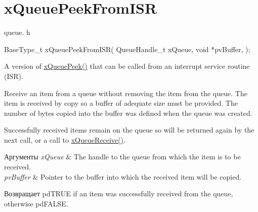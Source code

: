 \hypertarget{group__x_queue_peek_from_i_s_r}{}\section{x\+Queue\+Peek\+From\+I\+SR}
\label{group__x_queue_peek_from_i_s_r}
queue. h 
\begin{DoxyPre}
BaseType\_t xQueuePeekFromISR(
                                QueueHandle\_t xQueue,
                                void *pvBuffer,
                            );\end{DoxyPre}


A version of \mbox{\hyperlink{queue_8h_a3f9e430276fe5244417fd82644ec8a75}{x\+Queue\+Peek()}} that can be called from an interrupt service routine (I\+SR).

Receive an item from a queue without removing the item from the queue. The item is received by copy so a buffer of adequate size must be provided. The number of bytes copied into the buffer was defined when the queue was created.

Successfully received items remain on the queue so will be returned again by the next call, or a call to \mbox{\hyperlink{queue_8h_ae8364d988c6f9b63c771cc2b3dfe5df9}{x\+Queue\+Receive()}}.


\begin{DoxyParams}{Аргументы}
{\em x\+Queue} & The handle to the queue from which the item is to be received.\\
\hline
{\em pv\+Buffer} & Pointer to the buffer into which the received item will be copied.\\
\hline
\end{DoxyParams}
\begin{DoxyReturn}{Возвращает}
pd\+T\+R\+UE if an item was successfully received from the queue, otherwise pd\+F\+A\+L\+SE. 
\end{DoxyReturn}
